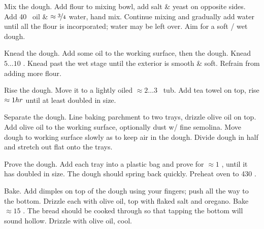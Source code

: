 \begin{preparation}
\item Mix the dough.
	Add flour to mixing bowl, add salt \& yeast on opposite sides.
	Add 40 \milliliter~oil \& $\approx\threefourth$ water, hand mix.
	Continue mixing and gradually add water until all the flour is incorporated; water may be left over.
	Aim for a soft / wet dough.

\item Knead the dough.
	Add some oil to the working surface, then the dough.
	Knead $5 \dots 10$ \minute.
	Knead past the wet stage until the exterior is smooth \& soft.
	Refrain from adding more flour.

\item Rise the dough.
	Move it to a lightly oiled $\approx 2 \dots 3$ \quart~tub.
	Add tea towel on top, rise $\approx 1 \hour$ until at least doubled in size.

\item Separate the dough.
	Line baking parchment to two trays, drizzle olive oil on top.
	Add olive oil to the working surface, optionally dust w/ fine semolina.
	Move dough to working surface slowly as to keep air in the dough.
	Divide dough in half and stretch out flat onto the trays.

\item Prove the dough.
	Add each tray into a plastic bag and prove for $\approx 1$ \hour, until it has doubled in size.
	The dough should spring back quickly.
	Preheat oven to 430 \Fahrenheit.

\item Bake.
	Add dimples on top of the dough using your fingers; push all the way to the bottom.
	Drizzle each with olive oil, top with flaked salt and oregano.
	Bake $\approx 15$ \minute.
	The bread should be cooked through so that tapping the bottom will sound hollow.
	Drizzle with olive oil, cool.
\end{preparation}


\recipeend
